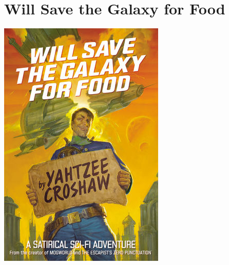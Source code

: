 \documentclass{tufte-handout}
\makeatletter
\newcommand{\varcaption}[2][0pt]{%
  \gsetlength{\@tufte@caption@vertical@offset}{-#1}%
  \gdef\@tufte@stored@varcaption{#2}%
}
\gdef\@tufte@stored@varcaption{} %
\makeatother
\begin{document}
\section*{Will Save the Galaxy for Food}
\begin{marginfigure}[7\baselineskip]
   \includegraphics[width=\linewidth]{images/will_save_galaxy_for_food.jpg}
   \varcaption{\href{https://www.darkhorse.com/Books/30-574/Will-Save-the-Galaxy-for-Food-TPB}{Publisher Link}, \href{https://www.amazon.com/Will-Save-Galaxy-Yahtzee-Croshaw/dp/1506701655/}{Amazon Link}}
\end{marginfigure}
\end{document}
